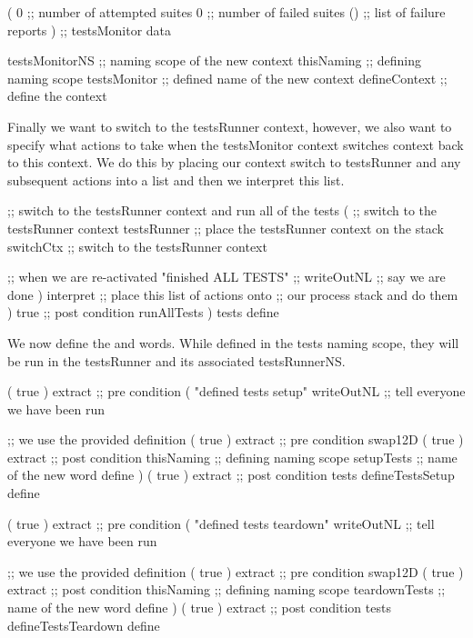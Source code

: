     (
      0             ;; number of attempted suites
      0             ;; number of failed suites
      ()            ;; list of failure reports
    )               ;; testsMonitor data
  
    testsMonitorNS  ;; naming scope of the new context
    thisNaming      ;; defining naming scope
    testsMonitor    ;; defined name of the new context
    defineContext   ;; define the context
\stopJoylolCode

Finally we want to switch to the testsRunner context, however, we also 
want to specify what actions to take when the testsMonitor context 
switches context back to this context. We do this by placing our context 
switch to testsRunner and any subsequent actions into a list and then we 
interpret this list. 

\startJoylolCode
    ;; switch to the testsRunner context and run all of the tests
    (
      ;; switch to the testsRunner context
      testsRunner ;; place the testsRunner context on the stack
      switchCtx   ;; switch to the testsRunner context
    
      ;; when we are re-activated
      "finished ALL TESTS"  ;;
      writeOutNL            ;; say we are done
    )
    interpret     ;; place this list of actions onto
                  ;; our process stack and do them
  )
  { true }        ;; post condition
  runAllTests
)
tests
define
\stopJoylolCode

We now define the  and  
words. While defined in the tests naming scope, they will be run in the 
testsRunner and its associated testsRunnerNS. 

\startJoylolCode
( { true } ) extract ;; pre condition
(
  "defined tests setup"
  writeOutNL  ;; tell everyone we have been run
  
              ;; we use the provided definition
  ( { true } ) extract ;; pre condition
  swap12D
  ( { true } ) extract ;; post condition
  thisNaming  ;; defining naming scope
  setupTests  ;; name of the new word
  define
)
( { true } ) extract ;; post condition
tests
defineTestsSetup
define
\stopJoylolCode

\startJoylolCode
( { true } ) extract ;; pre condition
(
  "defined tests teardown"
  writeOutNL    ;; tell everyone we have been run
  
                ;; we use the provided definition
  ( { true } ) extract ;; pre condition
  swap12D
  ( { true } ) extract ;; post condition
  thisNaming    ;; defining naming scope
  teardownTests ;; name of the new word
  define
)
( { true } ) extract ;; post condition
tests
defineTestsTeardown
define
\stopJoylolCode

